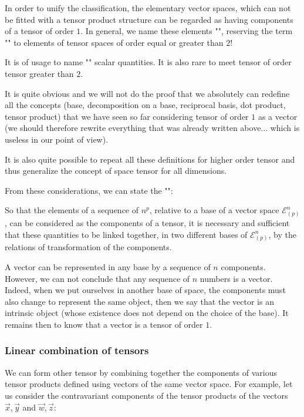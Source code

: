 	In order to unify the classification, the elementary vector spaces, which can not be fitted with a tensor product structure can be regarded as having components of a tensor of order $1$. In general, we name these elements "", reserving the term "" to elements of tensor spaces of order equal or greater than $2$!
	\begin{tcolorbox}[title=Remark,colframe=black,arc=10pt]
	It is of usage to name "" scalar quantities. It is also rare to meet tensor of order tensor greater than $2$.
	\end{tcolorbox}
	It is quite obvious and we will not do the proof  that we absolutely can redefine all the concepts (base, decomposition on a base, reciprocal basis, dot product, tensor product) that we have seen so far considering tensor of order $1$ as a vector (we should therefore rewrite everything that was already written above... which is useless in our point of view).

	It is also quite possible to repeat all these definitions for higher order tensor and thus generalize the concept of space tensor for all dimensions.

	From these considerations, we can state the "":
	
	So that the elements of a sequence of $n^p$, relative to a base of a vector space $\mathcal{E}_{(p)}^n$, can be considered as the components of a tensor, it is necessary and sufficient that these quantities to be linked together, in two different bases of $\mathcal{E}_{(p)}^n$, by the relations of transformation of the components.
	\begin{tcolorbox}[title=Remark,colframe=black,arc=10pt]
	A vector can be represented in any base by a sequence of $n$ components. However, we can not conclude that any sequence of $n$ numbers is a vector. Indeed, when we put ourselves in another base of space, the components must also change to represent the same object, then we say that the vector is an intrinsic object (whose existence does not depend on the choice of the base). It remains then to know that a vector is a tensor of order $1$.	
	\end{tcolorbox}

	\subsubsection{Linear combination of tensors}
	We can form other tensor by combining together the components of various tensor products defined using vectors of the same vector space. For example, let us consider the contravariant components of the tensor products of the vectors $\vec{x},\vec{y}$ and $\vec{w},\vec{z}$:
	
